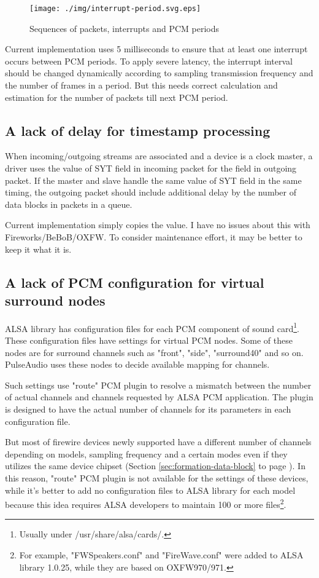 \documentclass[onecolumn]{article}
\begin{document}
\begin{figure}[H]
	\centering
	\texttt{[image: ./img/interrupt-period.svg.eps]}
	\caption{{Sequences of packets, interrupts and PCM periods}}
	\label{fig:interrupt-period}
\end{figure}

Current implementation uses 5 milliseconds to ensure that at least one interrupt occurs between PCM periods. To apply severe latency, the interrupt interval should be changed dynamically according to sampling transmission frequency and the number of frames in a period. But this needs correct calculation and estimation for the number of packets till next PCM period.


\subsection{A lack of delay for timestamp processing}

When incoming/outgoing streams are associated and a device is a clock master, a driver uses the value of SYT field in incoming packet for the field in outgoing packet. If the master and slave handle the same value of SYT field in the same timing, the outgoing packet should include additional delay by the number of data blocks in packets in a queue. 

Current implementation simply copies the value. I have no issues about this with Fireworks/BeBoB/OXFW. To consider maintenance effort, it may be better to keep it what it is.

\subsection{A lack of PCM configuration for virtual surround nodes}

ALSA library has configuration files for each PCM component of sound card\footnote{Usually under /usr/share/alsa/cards/.}. These configuration files have settings for virtual PCM nodes. Some of these nodes are for surround channels such as "front", "side", "surround40" and so on. PulseAudio uses these nodes to decide available mapping for channels.

Such settings use "route" PCM plugin to resolve a mismatch between the number of actual channels and channels requested by ALSA PCM application. The plugin is designed to have the actual number of channels for its parameters in each configuration file.

But most of firewire devices newly supported have a different number of channels depending on models, sampling frequency and a certain modes even if they utilizes the same device chipset (Section \ref{sec:formation-data-block} to page \pageref{sec:formation-data-block}). In this reason, "route" PCM plugin is not available for the settings of these devices, while it's better to add no configuration files to ALSA library for each model because this idea requires ALSA developers to maintain 100 or more files\footnote{For example, "FWSpeakers.conf" and "FireWave.conf" were added to ALSA library 1.0.25, while they are based on OXFW970/971.}.
\end{document}
